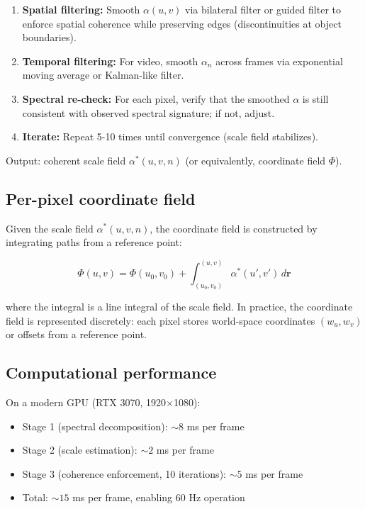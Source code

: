 \documentclass[11pt,twocolumn,a4paper]{article}
\theoremstyle{definition}
\begin{document}
\begin{enumerate}[leftmargin=1.4em]
  \item \textbf{Spatial filtering:} Smooth $\alpha(u,v)$ via bilateral filter or guided filter to enforce spatial coherence while preserving edges (discontinuities at object boundaries).
  \item \textbf{Temporal filtering:} For video, smooth $\alpha_n$ across frames via exponential moving average or Kalman-like filter.
  \item \textbf{Spectral re-check:} For each pixel, verify that the smoothed $\alpha$ is still consistent with observed spectral signature; if not, adjust.
  \item \textbf{Iterate:} Repeat 5-10 times until convergence (scale field stabilizes).
\end{enumerate}

Output: coherent scale field $\alpha^*(u,v,n)$ (or equivalently, coordinate field $\Phi$).

\subsection{Per-pixel coordinate field}

Given the scale field $\alpha^*(u,v,n)$, the coordinate field is constructed by integrating paths from a reference point:

\begin{equation}
\Phi(u,v) = \Phi(u_0, v_0) + \int_{(u_0,v_0)}^{(u,v)} \alpha^*(u',v') \, d\bm{r}
\end{equation}

where the integral is a line integral of the scale field. In practice, the coordinate field is represented discretely: each pixel stores world-space coordinates $(w_u, w_v)$ or offsets from a reference point.

\subsection{Computational performance}

On a modern GPU (RTX 3070, 1920$\times$1080):

\begin{itemize}[leftmargin=1.4em]
  \item Stage 1 (spectral decomposition): $\sim 8$ ms per frame
  \item Stage 2 (scale estimation): $\sim 2$ ms per frame
  \item Stage 3 (coherence enforcement, 10 iterations): $\sim 5$ ms per frame
  \item Total: $\sim 15$ ms per frame, enabling 60 Hz operation
\end{itemize}
\end{document}
